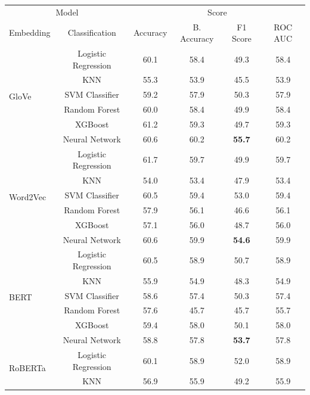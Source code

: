 \begin{table}[htb]
\centering
\begin{tabular}{l|c|c|c|c|c}
\hline


\multicolumn{2}{c|}{Model} & \multicolumn{4}{c}{Score} \\
\cline{1-6}
Embedding & Classification & Accuracy & B. Accuracy & F1 Score & ROC AUC \\

\hline
\multirow{6}{*}{GloVe}
    & Logistic Regression & 60.1 & 58.4 & 49.3 & 58.4 \\
    & KNN & 55.3 & 53.9 & 45.5 & 53.9 \\
    & SVM Classifier & 59.2 & 57.9 & 50.3 & 57.9 \\
    & Random Forest & 60.0 & 58.4 & 49.9 & 58.4 \\
    & XGBoost & 61.2 & 59.3 & 49.7 & 59.3 \\
    & Neural Network & 60.6 & 60.2 & \textbf{55.7} & 60.2 \\
\hline
\multirow{6}{*}{Word2Vec}
    & Logistic Regression & 61.7 & 59.7 & 49.9 & 59.7 \\
    & KNN & 54.0 & 53.4 & 47.9 & 53.4 \\
    & SVM Classifier & 60.5 & 59.4 & 53.0 & 59.4 \\
    & Random Forest & 57.9 & 56.1 & 46.6 & 56.1 \\
    & XGBoost & 57.1 & 56.0 & 48.7 & 56.0 \\
    & Neural Network & 60.6 & 59.9 & \textbf{54.6} & 59.9 \\
\hline
\multirow{6}{*}{BERT} 
    & Logistic Regression & 60.5 & 58.9 & 50.7 & 58.9 \\
    & KNN & 55.9 & 54.9 & 48.3 & 54.9 \\
    & SVM Classifier & 58.6 & 57.4 & 50.3 & 57.4 \\
    & Random Forest & 57.6 & 45.7 & 45.7 & 55.7 \\
    & XGBoost & 59.4 & 58.0 & 50.1 & 58.0 \\
    & Neural Network & 58.8  & 57.8 & \textbf{53.7} & 57.8 \\
\hline
\multirow{6}{*}{RoBERTa} 
    & Logistic Regression & 60.1 & 58.9 & 52.0 & 58.9 \\
    & KNN & 56.9 & 55.9 & 49.2 & 55.9 \\

\end{tabular}
\end{table}

